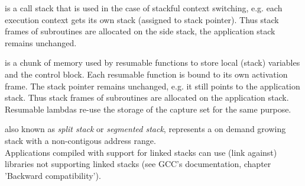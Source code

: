 is a call stack that is used in the case of stackful context switching, e.g.
each execution context gets its own stack (assigned to stack pointer). Thus
stack frames of subroutines are allocated on the side stack, the application
stack remains unchanged.

is a chunk of memory used by resumable functions to store local (stack)
variables and the control block. Each resumable function is bound to its own
activation frame. The stack pointer remains unchanged, e.g. it still points to
the application stack. Thus stack frames of subroutines are allocated on the 
application stack.\\
Resumable lambdas re-use the storage of the capture set for the same purpose.

also known as \textit{split stack}\cite{gccsplit} or
\textit{segmented stack}\cite{llvmseg}, represents a on demand growing stack
with a non-contigous address range.\\
Applications compiled with support for linked stacks can use (link against)
libraries not supporting linked stacks (see GCC's documentation\cite{gccsplit},
chapter 'Backward compatibility').
